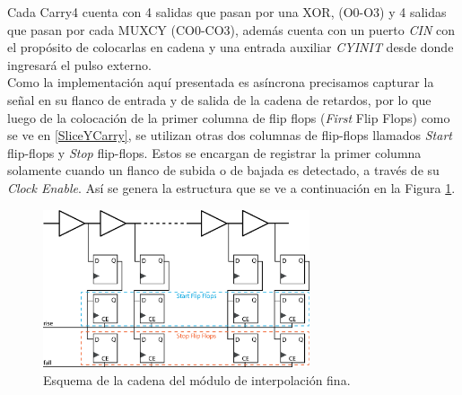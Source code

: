 Cada Carry4 cuenta con 4 salidas que pasan por una XOR, (O0-O3) y 4 salidas que pasan por
cada MUXCY (CO0-CO3), además cuenta con un puerto \textit{CIN} con el propósito de colocarlas
en cadena y una entrada auxiliar \textit{CYINIT} desde donde ingresará el pulso externo.\\
Como la implementación aquí presentada es asíncrona precisamos capturar la señal en su flanco de entrada y de
salida de la cadena de retardos, por lo que luego de la colocación de la primer columna de flip flops (\textit{First} Flip Flops) 
como se ve en \ref{SliceYCarry}, se utilizan otras dos columnas de flip-flops llamados \textit{Start} flip-flops y \textit{Stop} 
flip-flops. Estos se encargan de registrar la primer columna solamente cuando un flanco de subida o de bajada es detectado,
a través de su \textit{Clock Enable}. Así se genera la estructura que se ve a continuación en la Figura \ref{fig: fine}.

\begin{figure}[H]
     \centering
     \includegraphics[width=0.7\textwidth]{imagenes/fine.eps}
     \caption{Esquema de la cadena del módulo de interpolación fina.}
     \label{fig: fine}
\end{figure}

